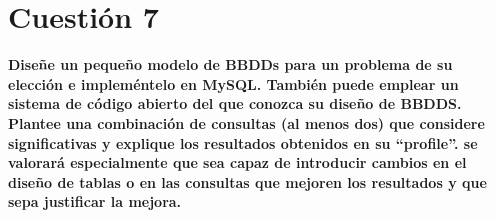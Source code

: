 \documentclass[a4paper,10pt]{article}
\newenvironment{answer}{%
\begin{list}{}{%
}%
\item[]}{\end{list}}
\begin{document}
\section{Cuestión 7}
\textbf{Diseñe un pequeño modelo de BBDDs para un problema de su elección e impleméntelo en MySQL. También puede emplear un sistema
de código abierto del que conozca su diseño de BBDDS. Plantee una combinación de consultas (al menos dos) que considere significativas
y explique los resultados obtenidos en su ``profile''. se valorará especialmente que sea capaz de introducir cambios en el 
diseño de tablas o en las consultas que mejoren los resultados y que sepa justificar la mejora.}
\begin{answer}
 
\end{answer}

\newpage
\printbibliography
\end{document}
